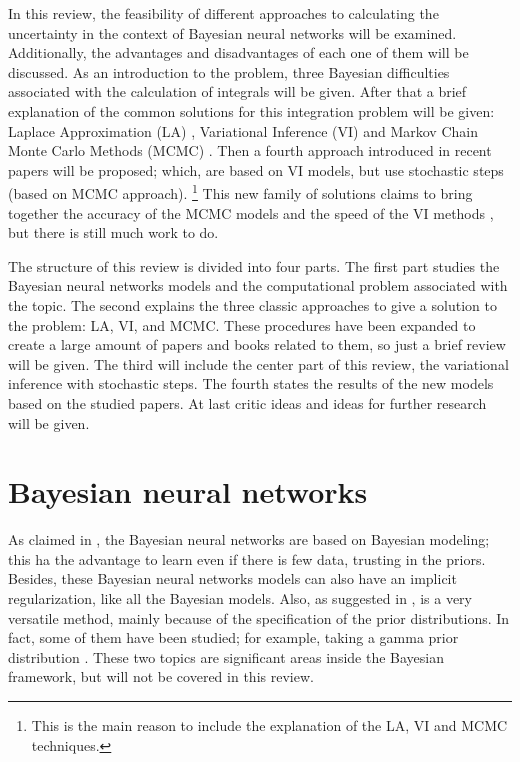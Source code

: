 \documentclass{article}
\begin{document}
In this review, the feasibility of different approaches to calculating the uncertainty in the context of Bayesian neural networks will be examined. Additionally, the advantages and disadvantages of each one of them will be discussed. As an introduction to the problem, three Bayesian difficulties associated with the calculation of integrals will be given. After that a brief explanation of the common solutions for this integration problem will be given: Laplace Approximation (LA) \cite{buntine1991bayesian}, Variational Inference (VI) \cite{bishop2006pattern} and Markov Chain Monte Carlo Methods (MCMC) \cite{bishop2006pattern}. Then a fourth approach introduced in recent papers \cite{salimans2015markov} \cite{gal2016uncertainty} will be proposed; which, are based on VI models, but use stochastic steps (based on MCMC approach). \footnote{This is the main reason to include the explanation of the LA, VI and MCMC techniques.} This new family of solutions claims to bring together the accuracy of the MCMC models and the speed of the VI methods \cite{salimans2015markov}, but there is still much work to do.

The structure of this review is divided into four parts. The first part studies the Bayesian neural networks models and the computational problem associated with the topic. The second explains the three classic approaches to give a solution to the problem: LA, VI, and MCMC. These procedures have been expanded to create a large amount of papers and books related to them, so just a brief review will be given. The third will include the center part of this review, the variational inference with stochastic steps. The fourth states the results of the new models based on the studied papers. At last critic ideas and ideas for further research will be given.

\section{Bayesian neural networks}

As claimed in \cite{gal2016uncertainty}, the Bayesian neural networks are based on Bayesian modeling; this ha the advantage to learn even if there is few data, trusting in the priors. Besides, these Bayesian neural networks models can also have an implicit regularization, like all the Bayesian models. Also, as suggested in \cite{buntine1991bayesian}, is a very versatile method, mainly because of the specification of the prior distributions. In fact, some of them have been studied; for example, taking a gamma prior distribution \cite{barber1998ensemble}. These two topics are significant areas inside the Bayesian framework, but will not be covered in this review.
\end{document}
